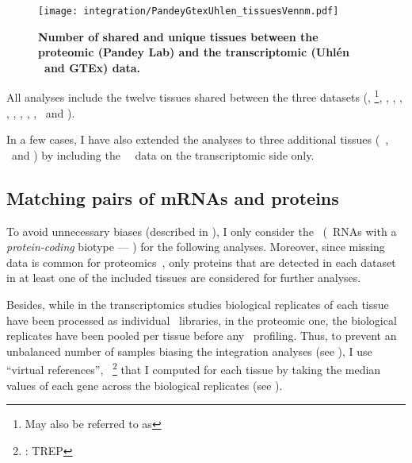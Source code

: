 \begin{figure}[!htbp]
    \texttt{[image: integration/PandeyGtexUhlen\_tissuesVennm.pdf]}
    \centering
    \caption[Number of shared and unique tissues between the proteomic
    dataset from Pandey Lab and the transcriptomic datasets (Uhlén \etal\ and
    Gtex)]{\label{fig:VennTissuePandeyGtexUhlen}\textbf{Number of shared and unique
    tissues between the proteomic (Pandey Lab) and the
    transcriptomic (Uhlén \etal\ and GTEx) data.} %
    }
\end{figure}

All analyses include the twelve tissues shared between the three
datasets (\adrenal, \Bladder{}\footnote{May also
be referred to as },
\hColon, \Oesophagus, \Heart,
\Kidney, \Liver, \Lung, \Ovary, \Pancreas,
\Prostate\ and \Testis).\mybr\

In a few cases, I have also extended the analyses
to three additional tissues (\ie\ \Gall, \Placenta\ and \Rectum)
by including the \uhlen\ \etal\ data on the transcriptomic side only.\mybr\

\subsection{Matching pairs of mRNAs and proteins}
To avoid unnecessary biases (described in ),
I only consider the \mRNAs\
(\ie\ \glspl{RNA} with a \emph{protein-coding} biotype --- )
for the following analyses.
Moreover, since missing data is common for proteomics~,
only proteins that are detected in each dataset
in at least one of the included tissues
are considered for further analyses.\mybr\

Besides,
while in the transcriptomics studies
biological replicates of each tissue have been processed
as individual \Rnaseq\ libraries,
in the proteomic one,
the biological replicates have been pooled per tissue before any \ms\ profiling.
Thus, to prevent an unbalanced number of samples biasing
the integration analyses (see ),
I use \enquote{virtual references},
\ie\ \treps\footnote{\trep{}: \glsdesc{TREP}}
that I computed for each tissue
by taking the median values of each gene
across the biological replicates
(see ).\mybr\

